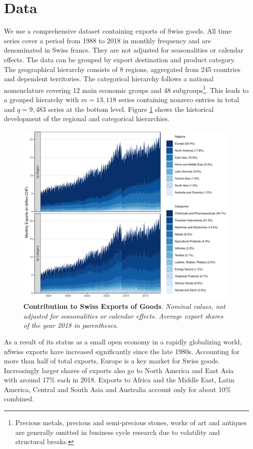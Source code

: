 \documentclass[a4paper,fleqn,11pt]{article}
\begin{document}
\section{Data}\label{sec:data}
We use a comprehensive dataset containing exports of Swiss goods. All time series cover a period from 1988 to 2018 in monthly frequency and are denominated in Swiss francs. They are not adjusted for seasonalities or calendar effects. The data can be grouped by export destination and product category. The geographical hierarchy consists of 8 regions, aggregated from 245 countries and dependent territories. The categorical hierarchy follows a national nomenclature covering 12 main economic groups and 48 subgroups\footnote{Precious metals, precious and semi-precious stones, works of art and antiques are generally omitted in business cycle research due to volatility and structural breaks.}. This leads to a grouped hierarchy with $m = 13,118$ series containing nonzero entries in total and $q = 9,483$ series at the bottom level. Figure \ref{fig:area} shows the historical development of the regional and categorical hierarchies.
\begin{figure}[H]
	\includegraphics[width=\textwidth]{fig/fig_area}
	\caption[Contribution to Swiss Exports of Goods]{\small{\textbf{Contribution to Swiss Exports of Goods}. \textit{Nominal values, not adjusted for seasonalities or calendar effects. Average export shares of the year 2018 in parentheses.}}}\label{fig:area}
\end{figure}
As a result of its status as a small open economy in a rapidly globalizing world, nSwiss exports have increased significantly since the late 1980s. Accounting for more than half of total exports, Europe is a key market for Swiss goods. Increasingly larger shares of exports also go to North America and East Asia with around 17\% each in 2018. Exports to Africa and the Middle East, Latin America, Central and South Asia and Australia account only for about 10\% combined.
\end{document}
